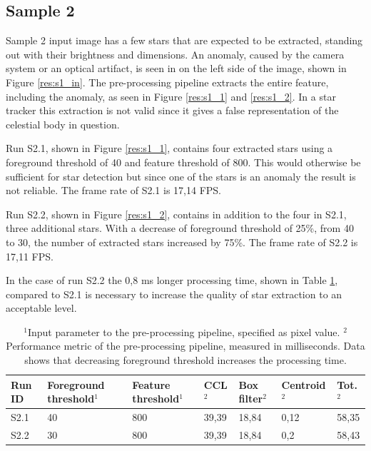 \documentclass[12pt]{report}
\begin{document}
\subsection*{Sample 2}
Sample 2 input image has a few stars that are expected to be extracted, standing out with their brightness and dimensions. An anomaly, caused by the camera system or an optical artifact, is seen in on the left side of the image, shown in Figure \ref{res:s1_in}. The pre-processing pipeline extracts the entire feature, including the anomaly, as seen in Figure \ref{res:s1_1} and \ref{res:s1_2}. In a star tracker this extraction is not valid since it gives a false representation of the celestial body in question.
\par
Run S2.1, shown in Figure \ref{res:s1_1}, contains four extracted stars using a foreground threshold of 40 and feature threshold of 800. This would otherwise be sufficient for star detection but since one of the stars is an anomaly the result is not reliable. The frame rate of S2.1 is 17,14 FPS.
\par
Run S2.2, shown in Figure \ref{res:s1_2}, contains in addition to the four in S2.1, three additional stars. With a decrease of foreground threshold of 25\%, from 40 to 30, the number of extracted stars increased by 75\%. The frame rate of S2.2 is 17,11 FPS.
\par
In the case of run S2.2 the 0,8 ms longer processing time, shown in Table \ref{table:s1_res}, compared to S2.1 is necessary to increase the quality of star extraction to an acceptable level.

\begin{table}[!h]
    \centering
    \begin{tabular}{|p{0.8cm}|p{2.5cm}|p{2cm}||p{1.25cm}|p{1.25cm}|p{1.9cm}|p{1cm}|}
        \hline
        \textbf{Run ID}&\textbf{Foreground threshold$^{1}$}&\textbf{Feature threshold$^{1}$}&\textbf{CCL$^{2}$}&\textbf{Box filter$^{2}$}&\textbf{Centroid$^{2}$}&\textbf{Tot.$^{2}$}\\
        \hline
        \hline
        S2.1&40&800&39,39&18,84&0,12&58,35\\
        \hline
        S2.2&30&800&39,39&18,84&0,2&58,43\\
        \hline
    \end{tabular}
    \caption{$^{1}$Input parameter to the pre-processing pipeline, specified as pixel value. $^{2}$Performance metric of the pre-processing pipeline, measured in milliseconds. Data shows that decreasing foreground threshold increases the processing time.}
    \label{table:s1_res}
\end{table}
\end{document}

